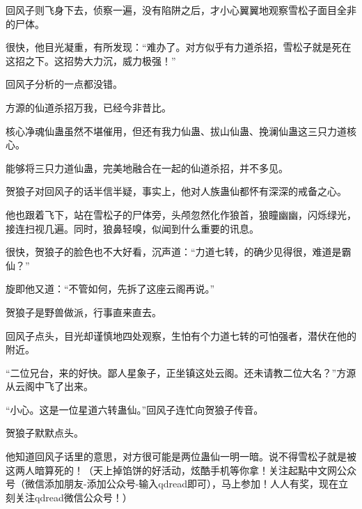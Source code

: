\begin{this_body}
回风子则飞身下去，侦察一遍，没有陷阱之后，才小心翼翼地观察雪松子面目全非的尸体。

很快，他目光凝重，有所发现：“难办了。对方似乎有力道杀招，雪松子就是死在这招之下。这招势大力沉，威力极强！”

回风子分析的一点都没错。

方源的仙道杀招万我，已经今非昔比。

核心净魂仙蛊虽然不堪催用，但还有我力仙蛊、拔山仙蛊、挽澜仙蛊这三只力道核心。

能够将三只力道仙蛊，完美地融合在一起的仙道杀招，并不多见。

贺狼子对回风子的话半信半疑，事实上，他对人族蛊仙都怀有深深的戒备之心。

他也跟着飞下，站在雪松子的尸体旁，头颅忽然化作狼首，狼瞳幽幽，闪烁绿光，接连扫视几遍。同时，狼鼻轻嗅，似闻到什么重要的讯息。

很快，贺狼子的脸色也不大好看，沉声道：“力道七转，的确少见得很，难道是霸仙？”

旋即他又道：“不管如何，先拆了这座云阁再说。”

贺狼子是野兽做派，行事直来直去。

回风子点头，目光却谨慎地四处观察，生怕有个力道七转的可怕强者，潜伏在他的附近。

“二位兄台，来的好快。鄙人星象子，正坐镇这处云阁。还未请教二位大名？”方源从云阁中飞了出来。

“小心。这是一位星道六转蛊仙。”回风子连忙向贺狼子传音。

贺狼子默默点头。

他知道回风子话里的意思，对方很可能是两位蛊仙一明一暗。说不得雪松子就是被这两人暗算死的！（天上掉馅饼的好活动，炫酷手机等你拿！关注起點中文网公众号（微信添加朋友-添加公众号-输入qdread即可），马上参加！人人有奖，现在立刻关注qdread微信公众号！）

\end{this_body}

